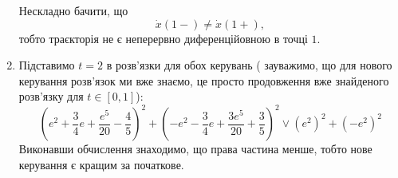 \begin{solution}
\begin{enumerate}
		Нескладно бачити, що 
		\[ \dot x (1-) \ne \dot x (1+), \]
		тобто траєкторія не є неперервно диференційовною в точці $1$.
		
		\item 
		Підставимо $t=2$ в розв'язки для обох керувань (%
		зауважимо, що для нового керування розв'язок ми вже знаємо, це просто продовження вже знайденого розв'язку для $t \in [0, 1]$):
		\[
			\left(e^2 + \dfrac34e + \dfrac{e^5}{20} - \dfrac45\right)^2 + \left(-e^2 - \dfrac34e + \dfrac{3e^5}{20} + \dfrac35\right)^2
			\lor
			(e^2)^2 + (-e^2)^2
		\]
	    Виконавши обчислення знаходимо, що права частина менше, тобто нове керування є кращим за початкове.
	\end{enumerate}
\end{solution}
